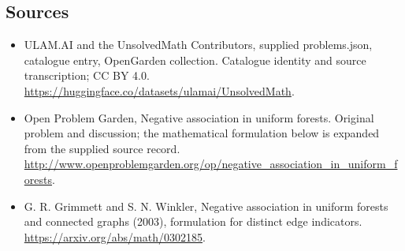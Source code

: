 \documentclass[11pt,a4paper]{article}
\begin{document}
\subsection{Sources}
\begin{itemize}
\item[S1] ULAM.AI and the UnsolvedMath Contributors, supplied problems.json, catalogue entry, OpenGarden collection. Catalogue identity and source transcription; CC BY 4.0.
\url{https://huggingface.co/datasets/ulamai/UnsolvedMath}.
\item[S2] Open Problem Garden, Negative association in uniform forests. Original problem and discussion; the mathematical formulation below is expanded from the supplied source record.
\url{http://www.openproblemgarden.org/op/negative_association_in_uniform_forests}.
\item[S3] G. R. Grimmett and S. N. Winkler, Negative association in uniform forests and connected graphs (2003), formulation for distinct edge indicators.
\url{https://arxiv.org/abs/math/0302185}.
\end{itemize}
\end{document}
